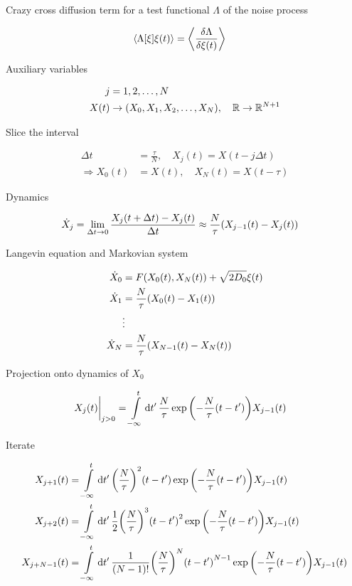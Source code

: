 \documentclass[a4paper,10pt]{article}
\newcommand{\intl}{\int\limits}
\begin{document}
Crazy cross diffusion term for a test functional $\Lambda$ of the noise process

\begin{align}
	\expval{\Lambda\bqty{\xi}\xi(t)}
	&=
	\expval{\frac{\delta\Lambda}{\delta\xi(t)}}
\end{align}

Auxiliary variables

\begin{align}
	j
	&=
	1,2,\ldots,N
\\
	X(t)
	&\to
	\pqty{
		X_0,X_1,X_2,\ldots,X_N
	},
	\quad
	\mathbb{R}\to\mathbb{R}^{N+1}
\end{align}

Slice the interval

\begin{align}
	\Delta t
	&=
	\frac{\tau}{N},
	\quad
	X_j(t)
	=
	X(t-j\Delta t)
\\
	\Rightarrow
	X_0(t)
	&=
	X(t),
	\quad
	X_N(t)
	=
	X(t-\tau)
\end{align}

Dynamics

\begin{align}
	\dot{X}_j
	&=
	\lim\limits_{\Delta t\to0}
	\frac{X_j(t+\Delta t)-X_j(t)}{\Delta t}
	\approx
	\frac{N}{\tau}
	\pqty{X_{j-1}(t)-X_j(t)}
\end{align}

Langevin equation and Markovian system

\begin{align}
	\dot{X}_0
	&=
	F(X_0(t),X_N(t))
	+
	\sqrt{2D_0}
	\xi(t)
\\
	\dot{X}_1
	&=
	\frac{N}{\tau}
	\pqty{X_0(t)-X_1(t)}
\\
	&\vdots
\\
	\dot{X}_N
	&=
	\frac{N}{\tau}
	\pqty{X_{N-1}(t)-X_N(t)}
\end{align}

Projection onto dynamics of $X_0$

\begin{align}
	\eval{X_j (t)}_{j>0}
	&=
	\intl_{-\infty}^t
	\dd{t^\prime}
	\frac{N}{\tau}
	\exp\pqty{-\frac{N}{\tau}(t-t^\prime)}
	X_{j-1}(t)
\end{align}

Iterate

\begin{align}
	X_{j+1}(t)
	&=
	\intl_{-\infty}^t
	\dd{t^\prime}
	\pqty{
		\frac{N}{\tau}
	}^2
	\pqty{t-t^\prime}
	\exp\pqty{-\frac{N}{\tau}(t-t^\prime)}
	X_{j-1}(t)
\\
	X_{j+2}(t)
	&=
	\intl_{-\infty}^t
	\dd{t^\prime}
	\frac{1}{2}
	\pqty{
		\frac{N}{\tau}
	}^3
	\pqty{t-t^\prime}^2
	\exp\pqty{-\frac{N}{\tau}(t-t^\prime)}
	X_{j-1}(t)
\\
	X_{j+N-1}(t)
	&=
	\intl_{-\infty}^t
	\dd{t^\prime}
	\frac{1}{(N-1)!}
	\pqty{
		\frac{N}{\tau}
	}^N
	\pqty{t-t^\prime}^{N-1}
	\exp\pqty{-\frac{N}{\tau}(t-t^\prime)}
	X_{j-1}(t)
\end{align}
\end{document}
